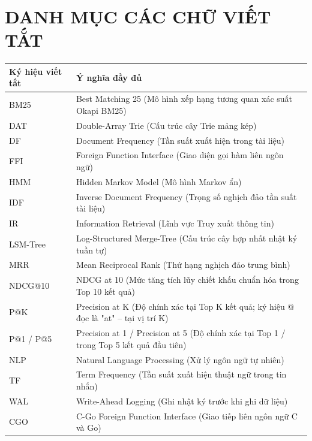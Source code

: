 \documentclass[12pt,a4paper,oneside]{report}
\begin{document}
\chapter*{DANH MỤC CÁC CHỮ VIẾT TẮT}
\begin{table}[H]
\begin{tabularx}{\textwidth}{l X}
\toprule
\textbf{Ký hiệu viết tắt} & \textbf{Ý nghĩa đầy đủ} \\
\midrule
BM25 & Best Matching 25 (Mô hình xếp hạng tương quan xác suất Okapi BM25) \\
DAT & Double-Array Trie (Cấu trúc cây Trie mảng kép) \\
DF & Document Frequency (Tần suất xuất hiện trong tài liệu) \\
FFI & Foreign Function Interface (Giao diện gọi hàm liên ngôn ngữ) \\
HMM & Hidden Markov Model (Mô hình Markov ẩn) \\
IDF & Inverse Document Frequency (Trọng số nghịch đảo tần suất tài liệu) \\
IR & Information Retrieval (Lĩnh vực Truy xuất thông tin) \\
LSM-Tree & Log-Structured Merge-Tree (Cấu trúc cây hợp nhất nhật ký tuần tự) \\
MRR & Mean Reciprocal Rank (Thứ hạng nghịch đảo trung bình) \\
NDCG@10 & NDCG at 10 (Mức tăng tích lũy chiết khấu chuẩn hóa trong Top 10 kết quả) \\
P@K & Precision at K (Độ chính xác tại Top K kết quả; ký hiệu @ đọc là "at" -- tại vị trí K) \\
P@1 / P@5 & Precision at 1 / Precision at 5 (Độ chính xác tại Top 1 / trong Top 5 kết quả đầu tiên) \\
NLP & Natural Language Processing (Xử lý ngôn ngữ tự nhiên) \\
TF & Term Frequency (Tần suất xuất hiện thuật ngữ trong tin nhắn) \\
WAL & Write-Ahead Logging (Ghi nhật ký trước khi ghi dữ liệu) \\
CGO & C-Go Foreign Function Interface (Giao tiếp liên ngôn ngữ C và Go) \\
\bottomrule
\end{tabularx}
\end{table}

\newpage
\tableofcontents
\newpage
\listoffigures
\newpage
\listoftables

\newpage
{}
\setcounter{page}{1}
\end{document}
